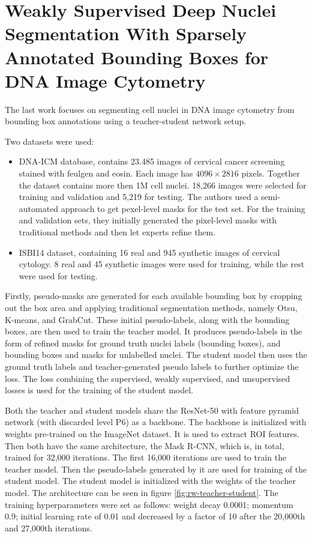 \section{Weakly Supervised Deep Nuclei Segmentation With Sparsely Annotated Bounding Boxes for DNA Image Cytometry \cite{Liang2023}}
The last work focuses on segmenting cell nuclei in DNA image cytometry from bounding box annotations using a teacher-student network setup.

Two datasets were used:

\begin{itemize}
    \item DNA-ICM database, contains 23.485 images of cervical cancer screening stained with feulgen and eosin. Each image has $4096\!\times\!2816$ pixels. Together the dataset contains more then 1M cell nuclei. 18,266 images were selected for training and validation and 5,219 for testing. The authors used a semi-automated approach to get pexel-level masks for the test set. For the training and validation sets, they initially generated the pixel-level masks with traditional methods and then let experts refine them.
    \item ISBI14 dataset, containing 16 real and 945 synthetic images of cervical cytology. 8 real and 45 synthetic images were used for training, while the rest were used for testing.
\end{itemize}

Firstly, pseudo-masks are generated for each available bounding box by cropping out the box area and applying traditional segmentation methods, namely Otsu, K-means, and GrabCut. These initial pseudo-labels, along with the bounding boxes, are then used to train the teacher model. It produces pseudo-labels in the form of refined masks for ground truth nuclei labels (bounding boxes), and bounding boxes and masks for unlabelled nuclei. The student model then uses the ground truth labels and teacher-generated pseudo labels to further optimize the loss. The loss combining the supervised, weakly supervised, and unsupervised losses is used for the training of the student model.

Both the teacher and student models share the ResNet-50 with feature pyramid network (with discarded level P6) as a backbone. The backbone is initialized with weights pre-trained on the ImageNet dataset. It is used to extract ROI features. Then both have the same architecture, the Mask R-CNN, which is, in total, trained for 32,000 iterations. The first 16,000 iterations are used to train the teacher model. Then the pseudo-labels generated by it are used for training of the student model. The student model is initialized with the weights of the teacher model. The architecture can be seen in figure \ref{fig:rw-teacher-student}. The training hyperparameters were set as follows: weight decay 0.0001; momentum 0.9; initial learning rate of 0.01 and decreased by a factor of 10 after the 20,000th and 27,000th iterations.

